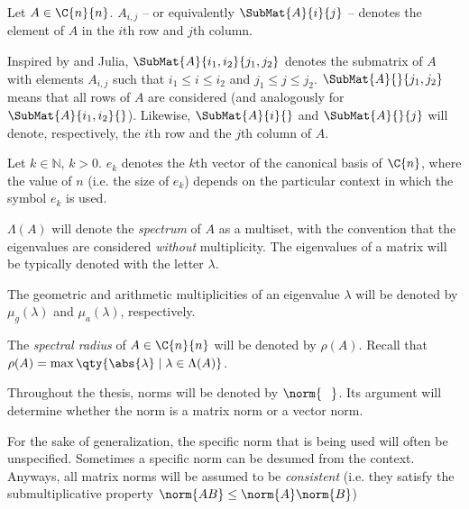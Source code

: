 \begin{notazione*}
	Let $A\in\C{n}{n}$. $A_{i,j}$ -- or equivalently $\SubMat{A}{i}{j}$ -- denotes the element of $A$ in the $i$th row and $j$th column. 
	
	Inspired by \matlab{} and Julia, $\SubMat{A}{i_1,i_2}{j_1,j_2}$ denotes the submatrix of $A$ with elements $A_{i,j}$ such that $i_1\le i\le i_2$ and $j_1\le j\le j_2$.
	$\SubMat{A}{}{j_1,j_2}$ means that all rows of $A$ are considered (and analogously for $\SubMat{A}{i_1,i_2}{}$).
	Likewise, $\SubMat{A}{i}{}$ and $\SubMat{A}{}{j}$ will denote, respectively, the $i$th row and the $j$th column of $A$. 
\end{notazione*}
\smallskip 

\begin{notazione*}
	Let $k\in\mathbb{N}$, $k>0$. $e_k$ denotes the $k$th vector of the canonical basis of $\C{n}$, where the value of $n$ (i.e. the size of $e_k$) depends on the particular context in which the symbol $e_k$ is used.
	
\end{notazione*}
\smallskip 

\begin{notazione*}
	$\Lambda(A)$ will denote the \emph{spectrum} of $A$ as a multiset, with the convention that the eigenvalues are considered \emph{without} multiplicity. The eigenvalues of a matrix will be typically denoted with the letter $\lambda$.
	
	The geometric and arithmetic multiplicities of an eigenvalue $\lambda$ will be denoted by 	$\mu_g(\lambda)$ and $\mu_a(\lambda)$, respectively.
	
	The \emph{spectral radius} of $A\in\C{n}{n}$ will be denoted by $\rho(A)$. Recall that $\rho(A)=\max\qty{\abs{\lambda}\mid\lambda\in\Lambda(A)}$. 
\end{notazione*}
\smallskip 

\begin{notazione*}
	Throughout the thesis, norms will be denoted by $\norm{\phantom{A}}$. Its argument will determine whether the norm is a matrix norm or a vector norm. 
	
	For the sake of generalization, the specific norm that is being used will often be unspecified. Sometimes a specific norm can be desumed from the context. Anyways, all matrix norms will be assumed to be \emph{consistent} (i.e. they satisfy the submultiplicative property $\norm{AB}\le\norm{A}\norm{B}$) 
	
\end{notazione*}
\smallskip 

